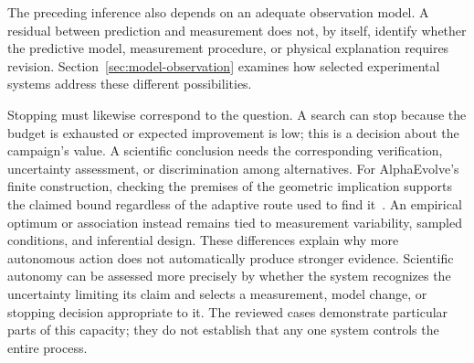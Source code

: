 The preceding inference also depends on an adequate observation model. A residual between prediction and measurement does not, by itself, identify whether the predictive model, measurement procedure, or physical explanation requires revision. Section~\ref{sec:model-observation} examines how selected experimental systems address these different possibilities.

Stopping must likewise correspond to the question. A search can stop because the budget is exhausted or expected improvement is low; this is a decision about the campaign's value. A scientific conclusion needs the corresponding verification, uncertainty assessment, or discrimination among alternatives. For AlphaEvolve's finite construction, checking the premises of the geometric implication supports the claimed bound regardless of the adaptive route used to find it~\cite{asd0063}. An empirical optimum or association instead remains tied to measurement variability, sampled conditions, and inferential design. These differences explain why more autonomous action does not automatically produce stronger evidence. Scientific autonomy can be assessed more precisely by whether the system recognizes the uncertainty limiting its claim and selects a measurement, model change, or stopping decision appropriate to it. The reviewed cases demonstrate particular parts of this capacity; they do not establish that any one system controls the entire process.
